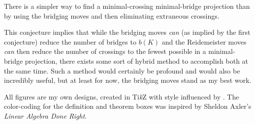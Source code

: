 \documentclass[titlepage]{article}
\begin{document}
\begin{conj}
    There is a simpler way to find a minimal-crossing minimal-bridge projection than by using the bridging moves and then eliminating extraneous crossings.
\end{conj}

This conjecture implies that while the bridging moves \emph{can} (as implied by the first conjecture) reduce the number of bridges to $b(K)$ and the Reidemeister moves \emph{can} then reduce the number of crossings to the fewest possible in a minimal-bridge projection, there exists some sort of hybrid method to accomplish both at the same time. Such a method would certainly be profound and would also be incredibly useful, but at least for now, the bridging moves stand as my best work.
\newpage






\noindent All figures are my own designs, created in Ti\emph{k}Z with style influenced by \cite{bib:knotbook}. The color-coding for the definition and theorem boxes was inspired by Sheldon Axler's \emph{Linear Algebra Done Right}.
\end{document}
